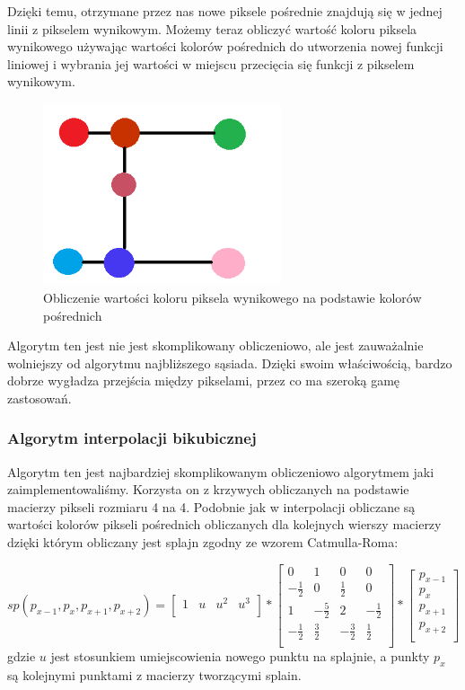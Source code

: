 \documentclass[twoside]{projektInzynierskiMS}
\begin{document}
Dzięki temu, otrzymane przez nas nowe piksele pośrednie znajdują się w jednej linii z pikselem wynikowym. Możemy teraz obliczyć wartość koloru piksela wynikowego używając wartości kolorów pośrednich do utworzenia nowej funkcji liniowej i wybrania jej wartości w miejscu przecięcia się funkcji z pikselem wynikowym. 

\begin{figure}[h]
\centering
\includegraphics[width=7cm]{Interpolation3.png}
\caption{Obliczenie wartości koloru piksela wynikowego na podstawie kolorów pośrednich}
\end{figure}

Algorytm ten jest nie jest skomplikowany obliczeniowo, ale jest zauważalnie wolniejszy od algorytmu najbliższego sąsiada. Dzięki swoim właściwością, bardzo dobrze wygładza przejścia między pikselami, przez co ma szeroką gamę zastosowań.

\subsubsection{Algorytm interpolacji bikubicznej}
Algorytm ten jest najbardziej skomplikowanym obliczeniowo algorytmem jaki zaimplementowaliśmy. Korzysta on z krzywych obliczanych na podstawie macierzy pikseli rozmiaru 4 na 4. Podobnie jak w interpolacji obliczane są wartości kolorów pikseli pośrednich obliczanych dla kolejnych wierszy macierzy dzięki którym obliczany jest splajn zgodny ze wzorem Catmulla-Roma:

$sp(p_{x-1},p_x,p_{x+1},p_{x+2}) = 
\begin{bmatrix}
	1 & u & u^2 & u^3 \\[0.3em]
\end{bmatrix}
*
\begin{bmatrix}
	0 & 1 & 0 & 0 \\[0.3em]
	-\frac{1}{2} & 0 & \frac{1}{2} & 0 \\[0.3em]
	1 & -\frac{5}{2} & 2 & -\frac{1}{2} \\[0.3em]
	-\frac{1}{2} & \frac{3}{2} & -\frac{3}{2} & \frac{1}{2} \\[0.3em]
\end{bmatrix}
*
\begin{bmatrix}
	p_{x-1} \\[0.3em]
	p_x \\[0.3em]
	p_{x+1} \\[0.3em]
	p_{x+2} \\[0.3em]
\end{bmatrix}
$
\\
gdzie $u$ jest stosunkiem umiejscowienia nowego punktu na splajnie, a punkty $p_x$ są kolejnymi punktami z macierzy tworzącymi splain.
\end{document}
